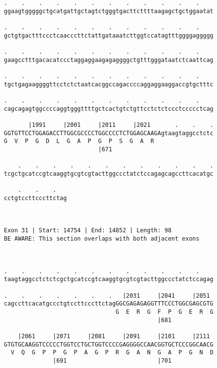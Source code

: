 \documentclass{article}
\begin{document}
\begin{Verbatim}
.    .    .    .    .    .    .    .    .    .    .    .    
ggaagtgggggctgcatgattgctagtctgggtgacttcttttaagagctgctggaatat
                                                            
.    .    .    .    .    .    .    .    .    .    .    .    
gctgtgactttccctcaacccttctattgataaatcttggtccatagtttggggaggggg
                                                            
.    .    .    .    .    .    .    .    .    .    .    .    
gaagcctttgacacatccctaggaggaagagaggggctgtttgggataatctcaattcag
                                                            
.    .    .    .    .    .    .    .    .    .    .    .    
tgctgagaaggggttcctctctaatcacggccagaccccaggaggaaggaccgtgctttc
                                                            
.    .    .    .    .    .    .    .    .    .    .    .    
cagcagagtggccccaggtgggttttgctcactgtctgttcctctctccctccccctcag
                                                            
       |1991     |2001     |2011     |2021       .    .    .
GGTGTTCCTGGAGACCTTGGCGCCCCTGGCCCCTCTGGAGCAAGAgtaagtaggcctctc
G  V  P  G  D  L  G  A  P  G  P  S  G  A  R                 
                           |671                             
  
    .    .    .    .    .    .    .    .    .    .    .    .
tcgctgcatccgtcaaggtgcgtcgtacttggccctatctccagagcagccttcacatgc
                                                            
    .    .    .   
cctgtccttcccttctag
                  
                  
 
Exon 31 | Start: 14754 | End: 14852 | Length: 98
BE AWARE: This section overlaps with both adjacent exons



.    .    .    .    .    .    .    .    .    .    .    .    
taagtaggcctctctcgctgcatccgtcaaggtgcgtcgtacttggccctatctccagag
                                                            
.    .    .    .    .    .    .   |2031     |2041     |2051 
cagccttcacatgccctgtccttcccttctagGGCGAGAGAGGTTTCCCTGGCGAGCGTG
                                G  E  R  G  F  P  G  E  R  G
                                            |681            
  
    |2061     |2071     |2081     |2091     |2101     |2111 
GTGTGCAAGGTCCCCCTGGTCCTGCTGGTCCCCGAGGGGCCAACGGTGCTCCCGGCAACG
  V  Q  G  P  P  G  P  A  G  P  R  G  A  N  G  A  P  G  N  D
              |691                          |701            
  

\end{Verbatim}
\end{document}
